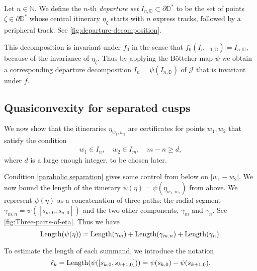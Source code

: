 \begin{definition}
Let $n \in \mathbb N$. We define the $n$-th \emph{departure set} $I_{n, \mathbb D} \subset \partial \mathbb D ^*$ to be the set of points $\zeta \in \partial \mathbb D^*$ whose central itinerary $\eta_{\zeta}$ starts with $n$ express tracks, followed by a peripheral track.
See \cref{fig:departure-decomposition}.
\end{definition}

This decomposition is invariant under $f_0$ in the sense that $f_0(I_{n+1, \mathbb D})=I_{n, \mathbb D}$, because of the invariance of $\eta _\zeta$.
Thus by applying the Böttcher map $\psi$ we obtain a corresponding departure decomposition $I_n = \psi(I_{n, \mathbb D})$ of $\mathcal J$ that is invariant under $f$.


\subsection{Quasiconvexity for separated cusps}
We now show that the itineraries $\eta_{w_1,w_2}$ are certificates for points $w_1,w_2$ that satisfy the condition 
\begin{align} \label{parabolic separation}
	w_1 \in I_n, \quad w_2 \in I_m, \quad m-n \geq d,
\end{align}
where $d$ is a large enough integer, to be chosen later. 
\begin{comment}
This means that the points lie in well-separated cusps near the main cusp $p$.
\end{comment}

Condition \eqref{parabolic separation} gives some control from below on $|w_1-w_2|$. We now bound the length of the itinerary $\psi(\eta)=\psi(\eta_{w_1,w_2})$ from above.
We represent $\psi(\eta)$ as a concatenation of three paths: the radial segment $\gamma_{m,n}=\psi([s_{m,0},s_{n,0}])$ and the two other components, $\gamma _m$ and $\gamma_n$. See \cref{fig:Three-parts-of-eta}.
Thus we have
\begin{equation}
	\operatorname{Length}(\psi(\eta))=\operatorname{Length}(\gamma_m)+\operatorname{Length}(\gamma_{m,n})+\operatorname{Length}(\gamma_n).
\end{equation}



To estimate the length of each summand, we introduce the notation 
\begin{equation}
\ell_k = \operatorname{Length}(\psi([s_{k,0},s_{k+1,0}])) = \psi(s_{k,0})-\psi(s_{k+1,0}).
\end{equation}

